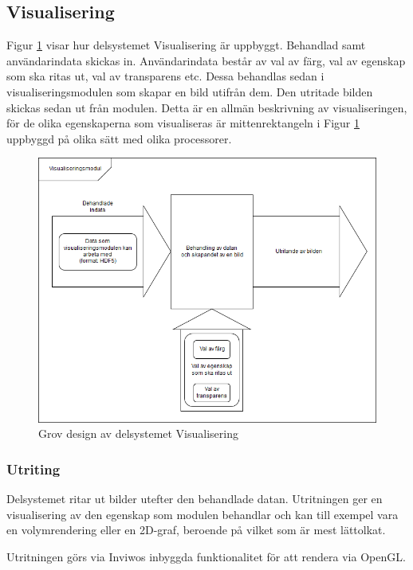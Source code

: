 \documentclass[a4paper,12pt]{article}
\begin{document}
\subsection{Visualisering}
Figur \ref{fig:visualisering} visar hur delsystemet Visualisering är uppbyggt. Behandlad samt användarindata skickas in. Användarindata består av val av färg, val av egenskap som ska ritas ut, val av transparens etc. Dessa behandlas sedan i visualiseringsmodulen som skapar en bild utifrån dem. Den utritade bilden skickas sedan ut från modulen. Detta är en allmän beskrivning av visualiseringen, för de olika egenskaperna som visualiseras är mittenrektangeln i Figur \ref{fig:visualisering} uppbyggd på olika sätt med olika processorer.
\label{visualisering}
\begin{figure}[H]
	\centering
	\includegraphics[scale=0.55]{Visualisering.png}
	\caption{Grov design av delsystemet Visualisering}
	\label{fig:visualisering}
\end{figure}
\subsubsection{Utriting}
Delsystemet ritar ut bilder utefter den behandlade datan. Utritningen ger en visualisering av den egenskap som modulen behandlar och kan till exempel vara en volymrendering eller en 2D-graf, beroende på vilket som är mest lättolkat. 

Utritningen görs via Inviwos inbyggda funktionalitet för att rendera via OpenGL. 
\end{document}
